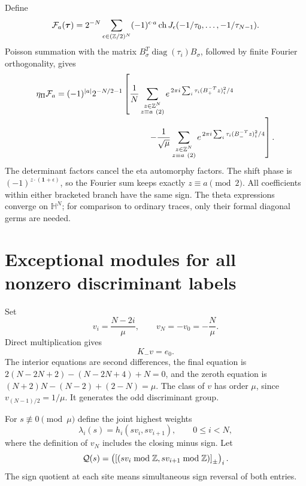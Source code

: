 \documentclass[11pt,a4paper]{article}
\numberwithin{equation}{section}
\theoremstyle{definition}\newtheorem{definition}[theorem]{Definition}
\theoremstyle{remark}\newtheorem{remark}[theorem]{Remark}
\newcommand{\one}{\mathbf1}\newcommand{\B}{\mathcal B}\newcommand{\W}{W_N}
\newcommand{\diag}{\operatorname{diag}}\renewcommand{\Vec}{\operatorname{Vec}}
\begin{document}
Define
\[
 \mathcal F_a(\boldsymbol\tau)=
 2^{-N}\sum_{\epsilon\in(\mathbb Z/2)^N}
       (-1)^{\epsilon\cdot a}
       \operatorname{ch} J_\epsilon(-1/\tau_0,\ldots,-1/\tau_{N-1}).
\]
Poisson summation with the matrix
$B_\sigma^T\diag(\tau_i)B_\sigma$, followed by finite Fourier
orthogonality, gives
\begin{equation}\label{g:eq:poisson}
\begin{split}
 \eta_\Pi\mathcal F_a
 ={}&(-1)^{|a|}2^{-N/2-1}
 \left[
 \frac1N\sum_{\substack{z\in\Z^N\\z\equiv a\ (2)}}
   e^{\,2\pi i\sum_i\tau_i(B_+^{-T}z)_i^2/4}\right.\\[-2pt]
 &\hspace{34mm}\left.
 -\frac1{\sqrt\mu}
 \sum_{\substack{z\in\Z^N\\z\equiv a\ (2)}}
   e^{\,2\pi i\sum_i\tau_i(B_-^{-T}z)_i^2/4}
 \right].
\end{split}
\end{equation}
The determinant factors cancel the eta automorphy factors.
The shift phase is $(-1)^{z\cdot(\one+\epsilon)}$, so the Fourier
sum keeps exactly $z\equiv a\pmod2$.
All coefficients within either bracketed branch have the same sign.
The theta expressions converge on $\mathbb H^N$; for comparison to
ordinary traces, only their formal diagonal germs are needed.

\section{Exceptional modules for all nonzero discriminant labels}
\label{g:sec:exceptional}
Set
\[
 v_i=\frac{N-2i}{\mu},\qquad
 v_N=-v_0=-\frac N\mu.
\]
Direct multiplication gives
\[
 K_-v=e_0.
\]
The interior equations are second differences, the final equation is
$2(N-2N+2)-(N-2N+4)+N=0$, and the zeroth equation is
$(N+2)N-(N-2)+(2-N)=\mu$.
The class of $v$ has order $\mu$, since
$v_{(N-1)/2}=1/\mu$. It generates the odd discriminant group.

For $s\not\equiv0\pmod\mu$ define the joint highest weights
\begin{equation}\label{g:eq:exceptionaltuple}
 \lambda_i(s)=h_i(sv_i,sv_{i+1}),\qquad 0\leq i<N,
\end{equation}
where the definition of $v_N$ includes the closing minus sign.
Let
\[
 \mathcal Q(s)=
 \left(\left[(sv_i\bmod\mathbb Z,sv_{i+1}\bmod\mathbb Z)\right]_{\pm}\right)_i.
\]
The sign quotient at each site means simultaneous sign reversal of
both entries.
\end{document}
